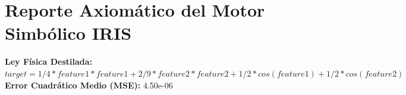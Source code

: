 \section*{Reporte Axiomático del Motor Simbólico IRIS}
\textbf{Ley Física Destilada:} $target = 1/4 * feature1*feature1 + 2/9 * feature2*feature2 + 1/2 * cos(feature1) + 1/2 * cos(feature2)$\\
\textbf{Error Cuadrático Medio (MSE):} 4.50e-06
